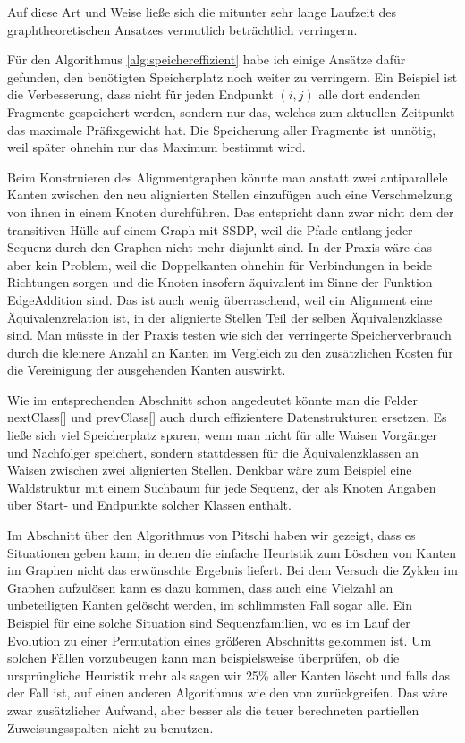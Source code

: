\noindent Auf diese Art und Weise ließe sich die mitunter sehr lange Laufzeit des graphtheoretischen Ansatzes vermutlich beträchtlich verringern.

Für den Algorithmus \ref{alg:speichereffizient} habe ich einige Ansätze dafür gefunden, den benötigten Speicherplatz noch weiter zu verringern. Ein Beispiel ist die Verbesserung, dass nicht für jeden Endpunkt $(i,j)$ alle dort endenden Fragmente gespeichert werden, sondern nur das, welches zum aktuellen Zeitpunkt das maximale Präfixgewicht hat. Die Speicherung aller Fragmente ist unnötig, weil später ohnehin nur das Maximum bestimmt wird.

Beim Konstruieren des Alignmentgraphen könnte man anstatt zwei antiparallele Kanten zwischen den neu alignierten Stellen einzufügen auch eine Verschmelzung von ihnen in einem Knoten durchführen. Das entspricht dann zwar nicht dem der transitiven Hülle auf einem Graph mit SSDP, weil die Pfade entlang jeder Sequenz durch den Graphen nicht mehr disjunkt sind. In der Praxis wäre das aber kein Problem, weil die Doppelkanten ohnehin für Verbindungen in beide Richtungen sorgen und die Knoten insofern äquivalent im Sinne der Funktion \textrm{EdgeAddition} sind. Das ist auch wenig überraschend, weil ein Alignment eine Äquivalenzrelation ist, in der alignierte Stellen Teil der selben Äquivalenzklasse sind. Man müsste in der Praxis testen wie sich der verringerte Speicherverbrauch durch die kleinere Anzahl an Kanten im Vergleich zu den zusätzlichen Kosten für die Vereinigung der ausgehenden Kanten auswirkt.

Wie im entsprechenden Abschnitt schon angedeutet könnte man die Felder nextClass[] und prevClass[] auch durch effizientere Datenstrukturen ersetzen. Es ließe sich viel Speicherplatz sparen, wenn man nicht für alle Waisen Vorgänger und Nachfolger speichert, sondern stattdessen für die Äquivalenzklassen an Waisen zwischen zwei alignierten Stellen. Denkbar wäre zum Beispiel eine Waldstruktur mit einem Suchbaum für jede Sequenz, der als Knoten Angaben über Start- und Endpunkte solcher Klassen enthält.

Im Abschnitt über den Algorithmus von Pitschi haben wir gezeigt, dass es Situationen geben kann, in denen die einfache Heuristik zum Löschen von Kanten im Graphen nicht das erwünschte Ergebnis liefert. Bei dem Versuch die Zyklen im Graphen aufzulösen kann es dazu kommen, dass auch eine Vielzahl an unbeteiligten Kanten gelöscht werden, im schlimmsten Fall sogar alle. Ein Beispiel für eine solche Situation sind Sequenzfamilien, wo es im Lauf der Evolution zu einer Permutation eines größeren Abschnitts gekommen ist. Um solchen Fällen vorzubeugen kann man beispielsweise überprüfen, ob die ursprüngliche Heuristik mehr als sagen wir 25\% aller Kanten löscht und falls das der Fall ist, auf einen anderen Algorithmus wie den von \cite{els93} zurückgreifen. Das wäre zwar zusätzlicher Aufwand, aber besser als die teuer berechneten partiellen Zuweisungsspalten nicht zu benutzen.

